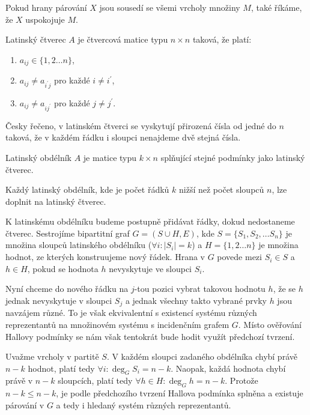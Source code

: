 \begin{t_remark}
  Pokud hrany párování $X$ jsou sousedí se všemi vrcholy množiny $M$, také říkáme, že $X$ uspokojuje $M$.
\end{t_remark}

\begin{t_definition}
  Latinský čtverec $A$ je čtvercová matice typu $n\times n$ taková, že platí:
  \begin{enumerate}
    \item $a_{ij}\in\{1,2\dots n\}$,
    \item $a_{ij}\neq a_{i^\prime j}$ pro každé $i\neq i^\prime$,
    \item $a_{ij}\neq a_{ij^\prime}$ pro každé $j\neq j^\prime$.
  \end{enumerate}
\end{t_definition}

\begin{t_remark}
  Česky řečeno, v latinském čtverci se vyskytují přirozená čísla od jedné do $n$ taková, že v každém řádku i sloupci nenajdeme dvě stejná čísla.
\end{t_remark}

\begin{t_definition}
  Latinský obdélník $A$ je matice typu $k \times n$ splňující stejné podmínky jako latinský čtverec.
\end{t_definition}

\begin{t_claim}
  Každý latinský obdélník, kde je počet řádků $k$ nižší než počet sloupců $n$, lze doplnit na latinský čtverec.
\end{t_claim}

\begin{t_proof}
  K latinskému obdélníku budeme postupně přidávat řádky, dokud nedostaneme čtverec. Sestrojíme bipartitní graf $G=(S\cup H, E)$, kde $S=\{S_1, S_2, \dots S_n\}$ je množina sloupců latinského obdélníku ($\forall i:|S_i|=k$) a $H=\{1,2\dots n\}$ je množina hodnot, ze kterých konstruujeme nový řádek. Hrana v $G$ povede mezi $S_i\in S$ a $h\in H$, pokud se hodnota $h$ nevyskytuje ve sloupci $S_i$.
  
  Nyní chceme do nového řádku na $j$-tou pozici vybrat takovou hodnotu $h$, že se $h$ jednak nevyskytuje v sloupci $S_j$ a jednak všechny takto vybrané prvky $h$ jsou navzájem různé. To je však ekvivalentní s existencí systému různých reprezentantů na množinovém systému s incidenčním grafem $G$. Místo ověřování Hallovy podmínky se nám však tentokrát bude hodit využít předchozí tvrzení.
  
  Uvažme vrcholy v partitě $S$. V každém sloupci zadaného obdélníka chybí právě $n-k$ hodnot, platí tedy $\forall i:\deg_G S_i=n-k$. Naopak, každá hodnota chybí právě v $n-k$ sloupcích, platí tedy $\forall h\in H:\deg_G h=n-k$. Protože $n-k\leq n-k$, je podle předchozího tvrzení Hallova podmínka splněna a existuje párování v $G$ a tedy i hledaný systém různých reprezentantů.
\end{t_proof}

